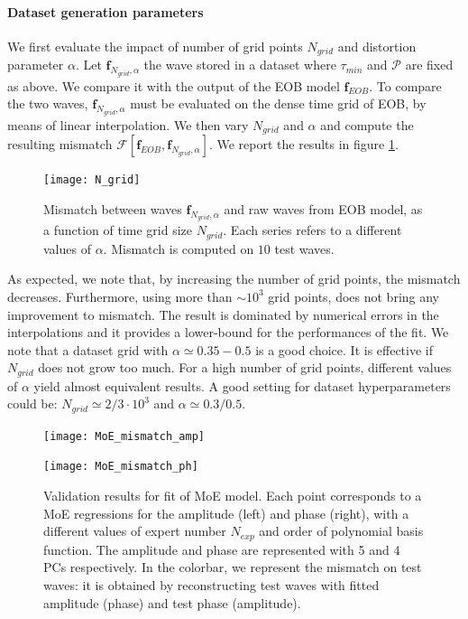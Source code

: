 \paragraph{Dataset generation parameters}
We first evaluate the impact of number of grid points $N_{grid}$ and distortion parameter $\alpha$.
Let $\mathbf{f}_{N_{grid}, \alpha}$ the wave stored in a dataset where $\tau_{min}$ and $\mathcal{P}$ are fixed as above. We compare it with the output of the EOB model $\mathbf{f}_{EOB}$.
To compare the two waves, $\mathbf{f}_{N_{grid}, \alpha}$ must be evaluated on the dense time grid of EOB, by means of linear interpolation.
We then vary $N_{grid}$ and $\alpha$ and compute the resulting mismatch $\mathcal{F}[\mathbf{f}_{EOB}, \mathbf{f}_{N_{grid}, \alpha}]$.
We report the results in figure \ref{fig:N_grid}.
\begin{figure}[!t]
	\centering
	\texttt{[image: N\_grid]}
	\caption{Mismatch between waves $\mathbf{f}_{N_{grid}, \alpha}$ and raw waves from EOB model, as a function of time grid size $N_{grid}$. Each series refers to a different values of $\alpha$.
Mismatch is computed on $10$ test waves.
}
	\label{fig:N_grid}
\end{figure}
\par
As expected, we note that, by increasing the number of grid points, the mismatch decreases. Furthermore, using more than $\sim 10^3$ grid points, does not bring any improvement to mismatch. The result is dominated by numerical errors in the interpolations and it provides a lower-bound for the performances of the fit.
We note that a dataset grid with $\alpha\simeq 	0.35-0.5$ is a good choice.
It is effective if $N_{grid}$ does not grow too much. For a high number of grid points, different values of $\alpha$ yield almost equivalent results.
A good setting for dataset hyperparameters could be: $N_{grid} \simeq 2/3 \cdot 10^{3}$ and $\alpha \simeq 0.3/0.5$.
\begin{figure}[!t]
	\centering
    \begin{minipage}{.5\linewidth}
        \centering
        \texttt{[image: MoE\_mismatch\_amp]}
    \end{minipage}\hfill
    \begin{minipage}{.5\linewidth}
        \centering
        \texttt{[image: MoE\_mismatch\_ph]}
    \end{minipage}
	\caption{Validation results for fit of MoE model. Each point corresponds to a MoE regressions for the amplitude (left) and phase (right), with a different values of expert number $N_{exp}$ and order of polynomial basis function.
The amplitude and phase are represented with 5 and 4 PCs respectively.
In the colorbar, we represent the mismatch on test waves: it is obtained by reconstructing test waves with fitted amplitude (phase) and test phase (amplitude).
}
	\label{fig:MoE_test}
\end{figure}


